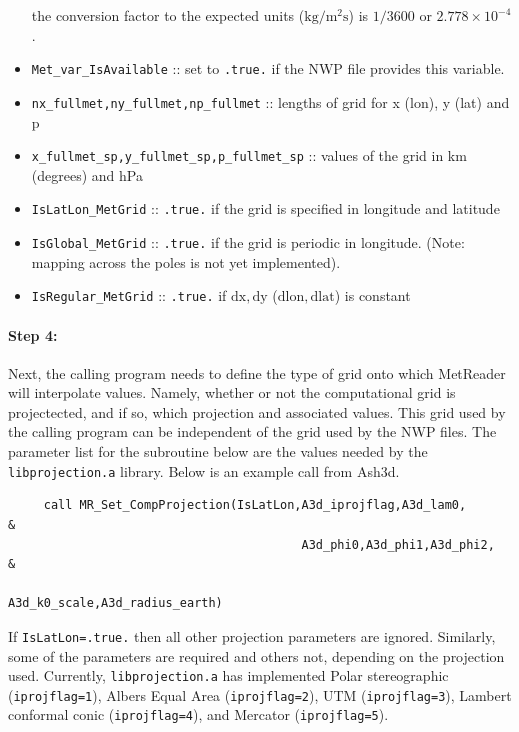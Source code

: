 \documentclass[11pt]{article}   %
\begin{document}
\begin{itemize}
the conversion factor to the expected units ($\mathrm{kg/m^2s}$) is $1/3600$ or
$2.778 \times 10^{-4}$.
\item \texttt{Met\_var\_IsAvailable} :: set to \texttt{.true.} if the NWP file
provides this variable.
\item \texttt{nx\_fullmet,ny\_fullmet,np\_fullmet} :: lengths of grid for x (lon), y (lat) and p
\item \texttt{x\_fullmet\_sp,y\_fullmet\_sp,p\_fullmet\_sp} :: values of the grid in km (degrees) and hPa
\item \texttt{IsLatLon\_MetGrid} :: \texttt{.true.} if the grid is specified in longitude and latitude
\item \texttt{IsGlobal\_MetGrid} :: \texttt{.true.} if the grid is periodic in longitude.  (Note:
mapping across the poles is not yet implemented).
\item \texttt{IsRegular\_MetGrid} :: \texttt{.true.} if $\mathrm{dx,dy}$ ($\mathrm{dlon,dlat}$) is constant
\end{itemize}

\paragraph{Step 4:} Next, the calling program needs to define the type of grid onto which MetReader 
will interpolate values.  Namely, whether or not the computational grid is projectected, and if so,
which projection and associated values.  This grid used by the calling program can be independent
of the grid used by the NWP files.  The parameter list for the subroutine below are the values
needed by the \texttt{libprojection.a} library.  Below is an example call from Ash3d.
\begin{verbatim}
     call MR_Set_CompProjection(IsLatLon,A3d_iprojflag,A3d_lam0,           &
                                         A3d_phi0,A3d_phi1,A3d_phi2,       &
                                         A3d_k0_scale,A3d_radius_earth)
\end{verbatim}
If \texttt{IsLatLon=.true.} then all other projection parameters are ignored.  Similarly,
some of the parameters are required and others not, depending on the projection used.
Currently, \texttt{libprojection.a} has implemented
Polar stereographic (\texttt{iprojflag=1}),
Albers Equal Area (\texttt{iprojflag=2}),
UTM (\texttt{iprojflag=3}),
Lambert conformal conic (\texttt{iprojflag=4}),
and Mercator (\texttt{iprojflag=5}).
\end{document}
